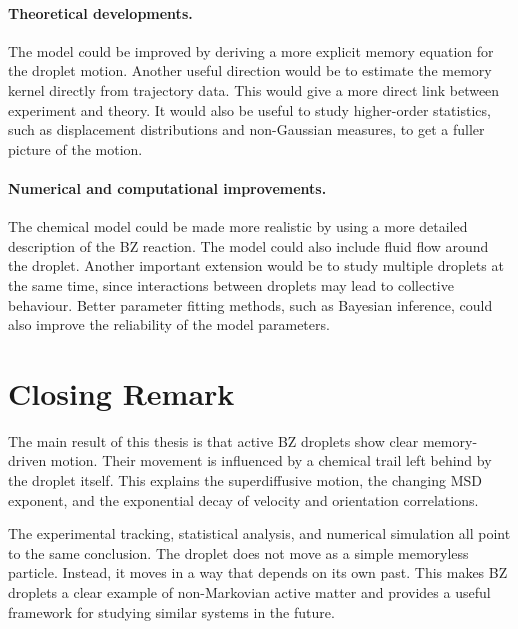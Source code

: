 \paragraph{Theoretical developments.}
The model could be improved by deriving a more explicit memory equation for the droplet motion. Another useful direction would be to estimate the memory kernel directly from trajectory data. This would give a more direct link between experiment and theory. It would also be useful to study higher-order statistics, such as displacement distributions and non-Gaussian measures, to get a fuller picture of the motion.

\paragraph{Numerical and computational improvements.}
The chemical model could be made more realistic by using a more detailed description of the BZ reaction. The model could also include fluid flow around the droplet. Another important extension would be to study multiple droplets at the same time, since interactions between droplets may lead to collective behaviour. Better parameter fitting methods, such as Bayesian inference, could also improve the reliability of the model parameters.

\section{Closing Remark}
\label{sec:closing}

The main result of this thesis is that active BZ droplets show clear memory-driven motion. Their movement is influenced by a chemical trail left behind by the droplet itself. This explains the superdiffusive motion, the changing MSD exponent, and the exponential decay of velocity and orientation correlations.

The experimental tracking, statistical analysis, and numerical simulation all point to the same conclusion. The droplet does not move as a simple memoryless particle. Instead, it moves in a way that depends on its own past. This makes BZ droplets a clear example of non-Markovian active matter and provides a useful framework for studying similar systems in the future.
